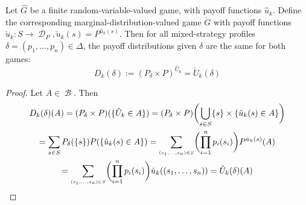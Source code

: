 \documentclass[a4paper]{scrreprt}
\DeclareMathOperator{\D}{\mathcal{D}}
\DeclareMathOperator{\B}{\mathcal{B}}
\begin{document}
    \begin{lemma}
        Let $\hat{G}$ be a finite random-variable-valued game, with payoff functions $\hat{u}_k$. 
        Define the corresponding marginal-distribution-valued game $\check{G}$ with payoff functions $\check{u}_k: S \to \D_P,
        \check{u}_k(s) = P^{\hat{u}_k(s)}$. Then for all mixed-strategy profiles $\delta = (p_1, \dots, p_n) \in \Delta$, the payoff distributions given $\delta$ are the same for both games:
        \[
            D_k(\delta) := (P_\delta \times P)^{\hat{U}_k} = \check{U}_k(\delta)
        \]
    \end{lemma}
    \begin{proof}
        Let $A \in \B$. Then
        \begin{multline*}
            D_k(\delta)(A)
            = (P_\delta \times P)(\{\hat{U}_k \in A\})
            = (P_\delta \times P)\biggl(\bigcup_{s \in S}\{s\} \times \{\hat{u}_k(s) \in A\}\biggr) \\
            = \sum_{s \in S} P_\delta(\{s\}) P(\{\hat{u}_k(s) \in A\})
            = \sum_{\scriptscriptstyle(s_1, \dots, s_n)\in S} \biggl(\prod_{i = 1}^n p_i(s_i)\biggr) P^{\hat{u}_k(s)}(A) \\
            = \sum_{\scriptscriptstyle(s_1, \dots, s_n)\in S} \biggl(\prod_{i = 1}^n p_i(s_i)\biggr) \check{u}_k((s_1, \dots, s_n))
            = \check{U}_k(\delta)(A)
        \end{multline*}
    \end{proof}
    
    
    
    \printbibliography
\end{document}
